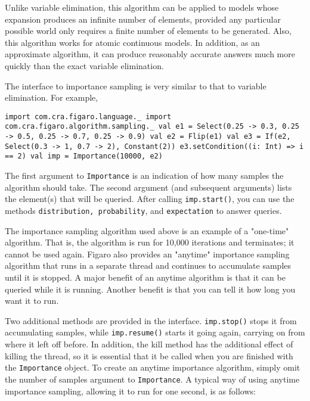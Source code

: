 Unlike variable elimination, this algorithm can be applied to models whose expansion produces an infinite number of elements, provided any particular possible world only requires a finite number of elements to be generated. Also, this algorithm works for atomic continuous models. In addition, as an approximate algorithm, it can produce reasonably accurate answers much more quickly than the exact variable elimination.

The interface to importance sampling is very similar to that to variable elimination. For example,

\begin{flushleft}
\texttt{import com.cra.figaro.language.\_
\newline import com.cra.figaro.algorithm.sampling.\_
\newline
\newline val e1 = Select(0.25 -> 0.3, 0.25 -> 0.5, 0.25 -> 0.7, 0.25 -> 0.9)
\newline val e2 = Flip(e1)
\newline val e3 = If(e2, Select(0.3 -> 1, 0.7 -> 2), Constant(2))
\newline e3.setCondition((i: Int) => i == 2)
\newline 
\newline val imp = Importance(10000, e2) }
\end{flushleft}

The first argument to \texttt{Importance} is an indication of how many samples the algorithm should take. The second argument (and subsequent arguments) lists the element(s) that will be queried. After calling \texttt{imp.start()}, you can use the methods \texttt{distribution, probabil\-ity}, and \texttt{expectation} to answer queries.

The importance sampling algorithm used above is an example of a "one-time" algorithm. That is, the algorithm is run for 10,000 iterations and terminates; it cannot be used again. Figaro also provides an "anytime" importance sampling algorithm that runs in a separate thread and continues to accumulate samples until it is stopped. A major benefit of an anytime algorithm is that it can be queried while it is running. Another benefit is that you can tell it how long you want it to run.

Two additional methods are provided in the interface. \texttt{imp.stop()} stops it from accumulating samples, while \texttt{imp.resume()} starts it going again, carrying on from where it left off before. In addition, the kill method has the additional effect of killing the thread, so it is essential that it be called when you are finished with the \texttt{Importance} object. To create an anytime importance algorithm, simply omit the number of samples argument to \texttt{Importance}. A typical way of using anytime importance sampling, allowing it to run for one second, is as follows:

